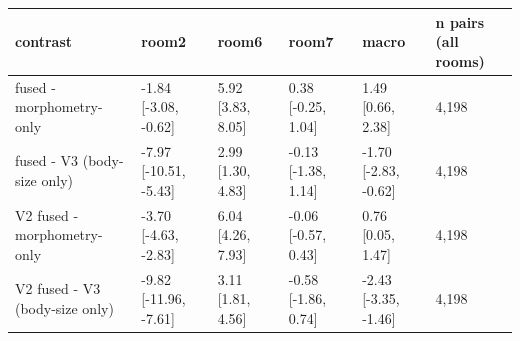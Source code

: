 \begin{tabular}{llllll}
\hline
contrast & room2 & room6 & room7 & macro & n pairs (all rooms) \\
\hline
fused - morphometry-only & -1.84 [-3.08, -0.62] & 5.92 [3.83, 8.05] & 0.38 [-0.25, 1.04] & 1.49 [0.66, 2.38] & 4,198 \\
fused - V3 (body-size only) & -7.97 [-10.51, -5.43] & 2.99 [1.30, 4.83] & -0.13 [-1.38, 1.14] & -1.70 [-2.83, -0.62] & 4,198 \\
V2 fused - morphometry-only & -3.70 [-4.63, -2.83] & 6.04 [4.26, 7.93] & -0.06 [-0.57, 0.43] & 0.76 [0.05, 1.47] & 4,198 \\
V2 fused - V3 (body-size only) & -9.82 [-11.96, -7.61] & 3.11 [1.81, 4.56] & -0.58 [-1.86, 0.74] & -2.43 [-3.35, -1.46] & 4,198 \\
\hline
\end{tabular}
